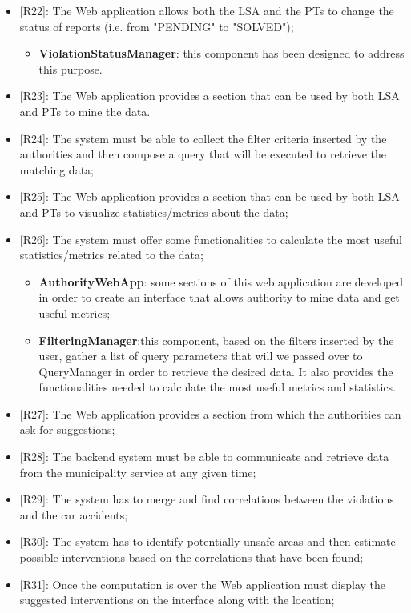 \begin{itemize}
\begin{itemize}
    \end{itemize}
    \item {[R22]}: The Web application allows both the LSA and the PTs to change the status of reports (i.e. from "PENDING" to "SOLVED");
    \begin{itemize}
      \item \textbf{ViolationStatusManager}: this component has been designed to address this purpose.
    \end{itemize}
    \item {[R23]}: The Web application provides a section that can be used by both LSA and PTs to mine the data.
    \item[] {[R24]}: The system must be able to collect the filter criteria inserted by the authorities and then compose a query that will be executed to retrieve the matching data;
    \item[] {[R25]}: The Web application provides a section that can be used by both LSA and PTs to visualize statistics/metrics about the data;
    \item[] {[R26]}: The system must offer some functionalities to calculate the most useful statistics/metrics related to the data;
    \begin{itemize}
      \item \textbf{AuthorityWebApp}: some sections of this web application are developed in order to create an interface that allows authority to mine data and get useful metrics;
      \item \textbf{FilteringManager}:this component, based on the filters inserted by the user, gather a list of query parameters that will we passed over to QueryManager in order to retrieve the desired data. It also provides the functionalities needed to calculate the most useful metrics and statistics.
    \end{itemize}    
    \item {[R27]}: The Web application provides a section from which the authorities can ask for suggestions;
    \item {[R28]}: The backend system must be able to communicate and retrieve data from the municipality service at any given time;
    \item {[R29]}: The system has to merge and find correlations between the violations and the car accidents;
    \item {[R30]}: The system has to identify potentially unsafe areas and then estimate possible interventions based on the correlations that have been found;
    \item {[R31]}: Once the computation is over the Web application must display the suggested interventions on the interface along with the location;
\end{itemize}
